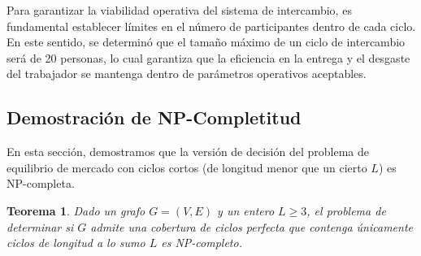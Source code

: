 \documentclass[twocolumn, fontsize=10pt]{article}
\newtheorem{theorem}{Teorema}
\theoremstyle{definition} %
\begin{document}
Para garantizar la viabilidad operativa del sistema de intercambio, es fundamental establecer límites en el número de participantes dentro de cada ciclo. En este sentido, se determinó que el tamaño máximo de un ciclo de intercambio será de 20 personas, lo cual garantiza que la eficiencia en la entrega y el desgaste del trabajador se mantenga dentro de parámetros operativos aceptables.

\subsection{Demostración de NP-Completitud}

En esta sección, demostramos que la versión de decisión del problema de equilibrio de mercado con ciclos cortos (de longitud menor que un cierto $L$) es NP-completa.

\begin{theorem}
Dado un grafo $G = (V, E)$ y un entero $L \geq 3$, el problema de determinar si $G$ admite una cobertura de ciclos perfecta que contenga únicamente ciclos de longitud a lo sumo $L$ es NP-completo.
\end{theorem}
\end{document}
